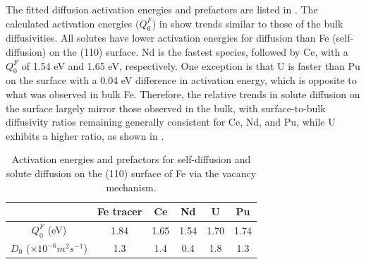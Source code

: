 \documentclass[preprint,12pt]{elsarticle}
\begin{document}
The fitted diffusion activation energies and prefactors are listed in . The calculated activation energies ($Q_0^F$) in  show trends similar to those of the bulk diffusivities. All solutes have lower activation energies for diffusion than Fe (self-diffusion) on the (110) surface. Nd is the fastest species, followed by Ce, with a $Q_0^F$ of 1.54 eV and 1.65 eV, respectively. One exception is that U is faster than Pu on the surface with a 0.04 eV difference in activation energy, which is opposite to what was observed in bulk Fe. Therefore, the relative trends in solute diffusion on the surface largely mirror those observed in the bulk, with surface-to-bulk diffusivity ratios remaining generally consistent for Ce, Nd, and Pu, while U exhibits a higher ratio, as shown in .

\begin{table}[!ht]
    \centering
    \caption{Activation energies and prefactors for self-diffusion and solute diffusion on the (110) surface of Fe via the vacancy mechanism.}
    \begin{tabular}{|c|c|c|c|c|c|}
    \hline
                & Fe tracer & Ce    & Nd    & U     & Pu \\
    \hline
    $Q_0^F$ (eV)& 1.84      & 1.65  &  1.54 & 1.70  & 1.74\\
    $D_0$ ($\times 10^{-6} m^2s^{-1}$)
                & 1.3       & 1.4   & 0.4   & 1.8   & 1.3\\
    \hline
    \end{tabular}
    \label{tab:surface_activation_energies}
\end{table}
\end{document}
